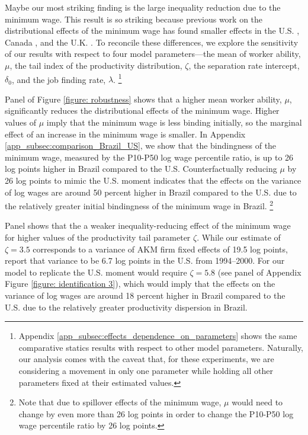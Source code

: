 Maybe our most striking finding is the large inequality reduction due to the minimum wage. This result is so striking because previous work on the distributional effects of the minimum wage has found smaller effects in the U.S. \citep{Lee1999, Autor2016, FortinLemieuxLloyd2021}, Canada \citep{FortinLemieux2015, Brochuetal2018}, and the U.K. \citep{ButcherDickensManning2012}. To reconcile these differences, we explore the sensitivity of our results with respect to four model parameters---the mean of worker ability, $\mu$, the tail index of the productivity distribution, $\zeta$, the separation rate intercept, $\delta_{0}$, and the job finding rate, $\lambda$.%
%
\footnote{Appendix \ref{app_subsec:effects_dependence_on_parameters} shows the same comparative statics results with respect to other model parameters. Naturally, our analysis comes with the caveat that, for these experiments, we are considering a movement in only one parameter while holding all other parameters fixed at their estimated values.}
%

Panel  of Figure \ref{figure: robustness} shows that a higher mean worker ability, $\mu$, significantly reduces the distributional effects of the minimum wage. Higher values of $\mu$ imply that the minimum wage is less binding initially, so the marginal effect of an increase in the minimum wage is smaller. In Appendix \ref{app_subsec:comparison_Brazil_US}, we show that the bindingness of the minimum wage, measured by the P10-P50 log wage percentile ratio, is up to 26 log points higher in Brazil compared to the U.S. Counterfactually reducing $\mu$ by 26 log points to mimic the U.S. moment indicates that the effects on the variance of log wages are around 50 percent higher in Brazil compared to the U.S. due to the relatively greater initial bindingness of the minimum wage in Brazil.%
%
\footnote{Note that due to spillover effects of the minimum wage, $\mu$ would need to change by even more than 26 log points in order to change the P10-P50 log wage percentile ratio by 26 log points.} %
%

Panel  shows that the a weaker inequality-reducing effect of the minimum wage for higher values of the productivity tail parameter $\zeta$. While our estimate of $\zeta = 3.5$ corresponds to a variance of AKM firm fixed effects of 19.5 log points, \citet{SongPriceGuvenenBloomvonWachter2018} report that variance to be 6.7 log points in the U.S. from 1994--2000. %
For our model to replicate the U.S. moment would require $\zeta = 5.8$ (see panel  of Appendix Figure \ref{figure: identification 3}), which would imply that the effects on the variance of log wages are around 18 percent higher in Brazil compared to the U.S. due to the relatively greater productivity dispersion in Brazil.

